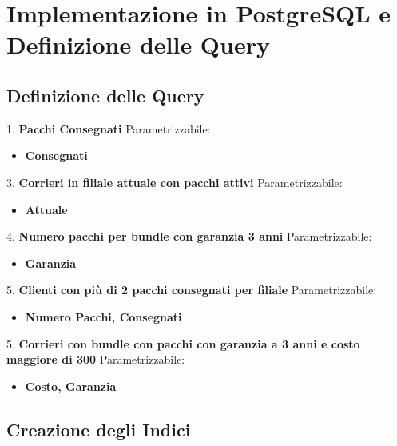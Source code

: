 \section{Implementazione in PostgreSQL e Definizione
delle Query}

\subsection{Definizione delle Query}

1. \textbf{Pacchi Consegnati }
  Parametrizzabile:
    \begin{itemize}
        \setlength{\itemindent}{+.5in}
        \item \textbf{Consegnati}
        \end{itemize}
3. \textbf{Corrieri in filiale attuale con pacchi attivi}
  Parametrizzabile:
    \begin{itemize}
        \setlength{\itemindent}{+.5in}
        \item \textbf{Attuale}
        \end{itemize}
4. \textbf{Numero pacchi per bundle con garanzia 3 anni}
  Parametrizzabile:
    \begin{itemize}
        \setlength{\itemindent}{+.5in}
        \item \textbf{Garanzia}
        \end{itemize}
5. \textbf{Clienti con più di 2 pacchi consegnati per filiale}
  Parametrizzabile:
    \begin{itemize}
        \setlength{\itemindent}{+.5in}
        \item \textbf{Numero Pacchi, Consegnati}
        \end{itemize}
5. \textbf{Corrieri con bundle con pacchi con garanzia a 3 anni e costo maggiore di 300}
    Parametrizzabile:
        \begin{itemize}
            \setlength{\itemindent}{+.5in}
            \item \textbf{Costo, Garanzia}
            \end{itemize}

\subsection{Creazione degli Indici}